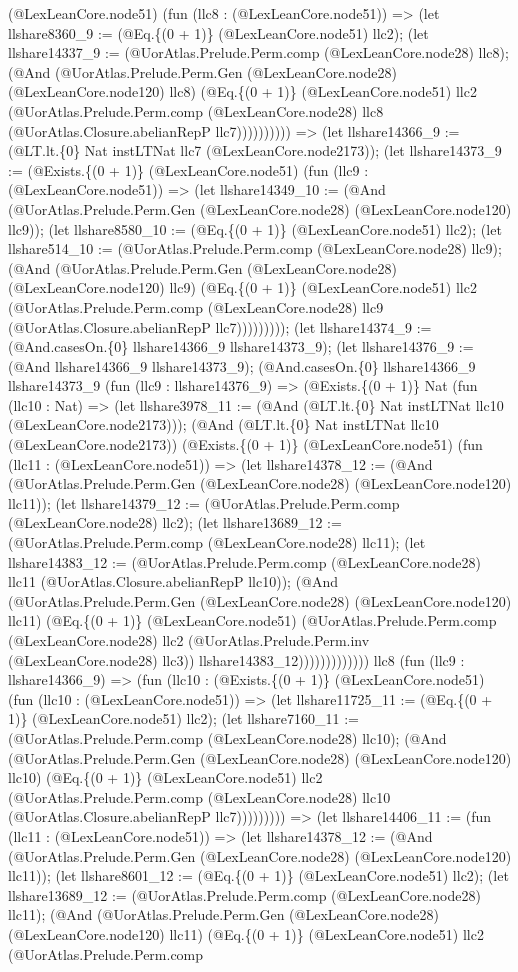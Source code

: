 \documentclass[11pt]{article}
\begin{document}
(@LexLeanCore.node51) (fun (llc8 : (@LexLeanCore.node51)) => (let llshare8360\_9 := (@Eq.\{(0 + 1)\} (@LexLeanCore.node51) llc2); (let llshare14337\_9 := (@UorAtlas.Prelude.Perm.comp (@LexLeanCore.node28) llc8); (@And (@UorAtlas.Prelude.Perm.Gen (@LexLeanCore.node28) (@LexLeanCore.node120) llc8) (@Eq.\{(0 + 1)\} (@LexLeanCore.node51) llc2 (@UorAtlas.Prelude.Perm.comp (@LexLeanCore.node28) llc8 (@UorAtlas.Closure.abelianRepP llc7)))))))))) => (let llshare14366\_9 := (@LT.lt.\{0\} Nat instLTNat llc7 (@LexLeanCore.node2173)); (let llshare14373\_9 := (@Exists.\{(0 + 1)\} (@LexLeanCore.node51) (fun (llc9 : (@LexLeanCore.node51)) => (let llshare14349\_10 := (@And (@UorAtlas.Prelude.Perm.Gen (@LexLeanCore.node28) (@LexLeanCore.node120) llc9)); (let llshare8580\_10 := (@Eq.\{(0 + 1)\} (@LexLeanCore.node51) llc2); (let llshare514\_10 := (@UorAtlas.Prelude.Perm.comp (@LexLeanCore.node28) llc9); (@And (@UorAtlas.Prelude.Perm.Gen (@LexLeanCore.node28) (@LexLeanCore.node120) llc9) (@Eq.\{(0 + 1)\} (@LexLeanCore.node51) llc2 (@UorAtlas.Prelude.Perm.comp (@LexLeanCore.node28) llc9 (@UorAtlas.Closure.abelianRepP llc7))))))))); (let llshare14374\_9 := (@And.casesOn.\{0\} llshare14366\_9 llshare14373\_9); (let llshare14376\_9 := (@And llshare14366\_9 llshare14373\_9); (@And.casesOn.\{0\} llshare14366\_9 llshare14373\_9 (fun (llc9 : llshare14376\_9) => (@Exists.\{(0 + 1)\} Nat (fun (llc10 : Nat) => (let llshare3978\_11 := (@And (@LT.lt.\{0\} Nat instLTNat llc10 (@LexLeanCore.node2173))); (@And (@LT.lt.\{0\} Nat instLTNat llc10 (@LexLeanCore.node2173)) (@Exists.\{(0 + 1)\} (@LexLeanCore.node51) (fun (llc11 : (@LexLeanCore.node51)) => (let llshare14378\_12 := (@And (@UorAtlas.Prelude.Perm.Gen (@LexLeanCore.node28) (@LexLeanCore.node120) llc11)); (let llshare14379\_12 := (@UorAtlas.Prelude.Perm.comp (@LexLeanCore.node28) llc2); (let llshare13689\_12 := (@UorAtlas.Prelude.Perm.comp (@LexLeanCore.node28) llc11); (let llshare14383\_12 := (@UorAtlas.Prelude.Perm.comp (@LexLeanCore.node28) llc11 (@UorAtlas.Closure.abelianRepP llc10)); (@And (@UorAtlas.Prelude.Perm.Gen (@LexLeanCore.node28) (@LexLeanCore.node120) llc11) (@Eq.\{(0 + 1)\} (@LexLeanCore.node51) (@UorAtlas.Prelude.Perm.comp (@LexLeanCore.node28) llc2 (@UorAtlas.Prelude.Perm.inv (@LexLeanCore.node28) llc3)) llshare14383\_12))))))))))))) llc8 (fun (llc9 : llshare14366\_9) => (fun (llc10 : (@Exists.\{(0 + 1)\} (@LexLeanCore.node51) (fun (llc10 : (@LexLeanCore.node51)) => (let llshare11725\_11 := (@Eq.\{(0 + 1)\} (@LexLeanCore.node51) llc2); (let llshare7160\_11 := (@UorAtlas.Prelude.Perm.comp (@LexLeanCore.node28) llc10); (@And (@UorAtlas.Prelude.Perm.Gen (@LexLeanCore.node28) (@LexLeanCore.node120) llc10) (@Eq.\{(0 + 1)\} (@LexLeanCore.node51) llc2 (@UorAtlas.Prelude.Perm.comp (@LexLeanCore.node28) llc10 (@UorAtlas.Closure.abelianRepP llc7))))))))) => (let llshare14406\_11 := (fun (llc11 : (@LexLeanCore.node51)) => (let llshare14378\_12 := (@And (@UorAtlas.Prelude.Perm.Gen (@LexLeanCore.node28) (@LexLeanCore.node120) llc11)); (let llshare8601\_12 := (@Eq.\{(0 + 1)\} (@LexLeanCore.node51) llc2); (let llshare13689\_12 := (@UorAtlas.Prelude.Perm.comp (@LexLeanCore.node28) llc11); (@And (@UorAtlas.Prelude.Perm.Gen (@LexLeanCore.node28) (@LexLeanCore.node120) llc11) (@Eq.\{(0 + 1)\} (@LexLeanCore.node51) llc2 (@UorAtlas.Prelude.Perm.comp 
\end{document}
